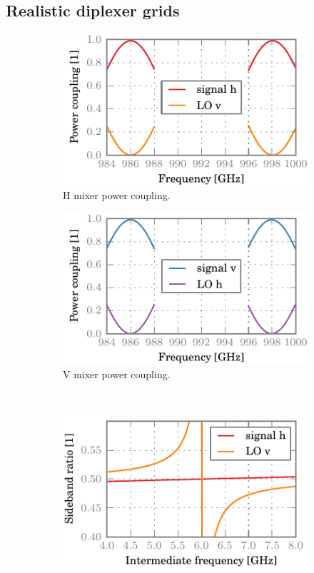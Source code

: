 \clearpage
\subsection{Realistic diplexer grids}

\begin{figure}[hbtp]
    \centering
    \begin{subfigure}[b]{.5\textwidth}
        \includegraphics{chapter_3/02_realgrids_h_dsb}%
        \caption{H mixer power coupling.}
    \end{subfigure}%
    \begin{subfigure}[b]{.5\textwidth}
        \includegraphics{chapter_3/02_realgrids_v_dsb}%
        \caption{V mixer power coupling.}
    \end{subfigure}%
    \\
    \begin{subfigure}[b]{.5\textwidth}
        \includegraphics{chapter_3/02_realgrids_h_sbr}%

\end{subfigure}
\end{figure}
